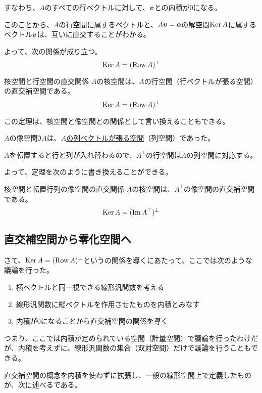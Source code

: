 \documentclass[../../../topic_linear-algebra]{subfiles}
\begin{document}
すなわち、$A$のすべての行ベクトルに対して、$\vb*{v}$との内積が0になる。

\br

このことから、$A$の行空間に属するベクトルと、$A\vb*{v} = \vb*{o}$の解空間$\operatorname{Ker} A$に属するベクトル$\vb*{v}$は、互いに直交することがわかる。

よって、次の関係が成り立つ。
\begin{equation*}
  \operatorname{Ker} A = (\operatorname{Row} A)^\perp
\end{equation*}

\begin{theorem}{核空間と行空間の直交関係}
  $A$の核空間は、$A$の行空間（行ベクトルが張る空間）の直交補空間である。
  \begin{equation*}
    \operatorname{Ker} A = (\operatorname{Row} A)^\perp
  \end{equation*}
\end{theorem}

この定理は、核空間と像空間との関係として言い換えることもできる。

\br

$A$の像空間$\Im A$は、\hyperref[sec:image-and-column-space]{$A$の列ベクトルが張る空間}（列空間）であった。

$A$を転置すると行と列が入れ替わるので、$A^\top$の行空間は$A$の列空間に対応する。

\br

よって、定理を次のように書き換えることができる。

\begin{theorem}{核空間と転置行列の像空間の直交関係}
  $A$の核空間は、$A^\top$の像空間の直交補空間である。
  \begin{equation*}
    \operatorname{Ker} A = (\Im A^\top)^\perp
  \end{equation*}
\end{theorem}


\subsection{直交補空間から零化空間へ}

さて、$\operatorname{Ker} A = (\operatorname{Row} A)^\perp$というの関係を導くにあたって、ここでは次のような議論を行った。
\begin{enumerate}
  \item 横ベクトルと同一視できる線形汎関数を考える
  \item 線形汎関数に縦ベクトルを作用させたものを内積とみなす
  \item 内積が0になることから直交補空間の関係を導く
\end{enumerate}

つまり、ここでは内積が定められている空間（計量空間）で議論を行ったわけだが、内積を考えずに、線形汎関数の集合（双対空間）だけで議論を行うこともできる。

\br

直交補空間の概念を内積を使わずに拡張し、一般の線形空間上で定義したものが、次に述べるである。
\end{document}
